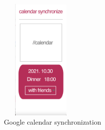 \documentclass[sigconf, nonacm]{acmart}
\begin{document}
\begin{enumerate}
\begin{figure}
  \centering
  \includegraphics[width=4cm, height=6cm]{calendar2.png}
  \caption{Google calendar synchronization}
  \label{fig:google calendar}
\end{figure}

\end{enumerate}



\clearpage
\end{document}
